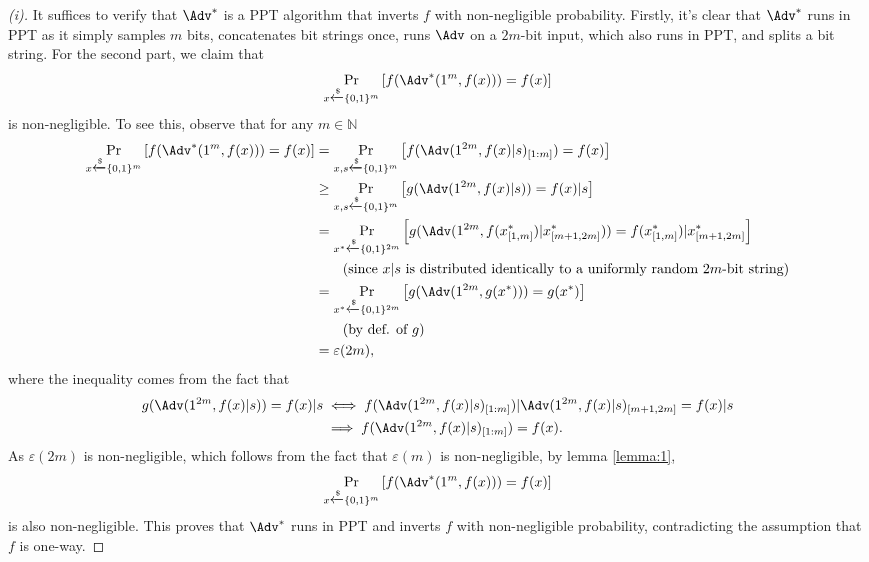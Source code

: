 \begin{proof}[(i)]
    It suffices to verify that $\Adv^\ast$ is a PPT algorithm that inverts $f$ with non-negligible probability. Firstly, it's clear that $\Adv^\ast$ runs in PPT as it simply samples $m$ bits, concatenates bit strings once, runs $\Adv$ on a $2m$-bit input, which also runs in PPT, and splits a bit string. For the second part, we claim that
    \[
    \Pr_{x\xleftarrow{\$}\{0,1\}^m}\left[f(\Adv^\ast(1^m, f(x))) = f(x)\right]
    \]
    is non-negligible. To see this, observe that for any $m\in\mathbb{N}$
    \begin{align*}
        \Pr_{x\xleftarrow{\$}\{0,1\}^m}\left[f(\Adv^\ast(1^m, f(x))) = f(x)\right]
        &= \Pr_{x,s\xleftarrow{\$}\{0,1\}^m}\left[f(\Adv(1^{2m}, f(x)|s)_{[1:m]}) = f(x)\right] \\
        &\ge \Pr_{x,s\xleftarrow{\$}\{0,1\}^m}\left[g(\Adv(1^{2m}, f(x)|s)) = f(x)|s\right] \\
        &= \Pr_{x^\ast\xleftarrow{\$}\{0,1\}^{2m}}\left[g(\Adv(1^{2m}, f(x^\ast_{[1,m]})|x^\ast_{[m+1,2m]})) = f(x^\ast_{[1,m]})|x^\ast_{[m+1,2m]}\right] \\
        &\qquad (\text{since } x|s \text{ is distributed identically to a uniformly random }2m\text{-bit string})\\
        &= \Pr_{x^\ast\xleftarrow{\$}\{0,1\}^{2m}}\left[g(\Adv(1^{2m}, g(x^\ast))) = g(x^\ast)\right]\\
        &\qquad (\text{by def. of } g) \\
        &= \varepsilon(2m),
    \end{align*}
    where the inequality comes from the fact that
    \begin{align*}
    g(\Adv(1^{2m}, f(x)|s)) = f(x)|s
    &\iff f(\Adv(1^{2m}, f(x)|s)_{[1:m]})|\Adv(1^{2m}, f(x)|s)_{[m+1,2m]} = f(x)|s \\
    &\implies f(\Adv(1^{2m}, f(x)|s)_{[1:m]}) = f(x).
    \end{align*}
    As $\varepsilon(2m)$ is non-negligible, which follows from the fact that $\varepsilon(m)$ is non-negligible, by lemma \ref{lemma:1},
    \[
    \Pr_{x\xleftarrow{\$}\{0,1\}^m}\left[f(\Adv^\ast(1^m, f(x))) = f(x)\right]
    \]
    is also non-negligible. This proves that $\Adv^\ast$ runs in PPT and inverts $f$ with non-negligible probability, contradicting the assumption that $f$ is one-way.
\end{proof}



